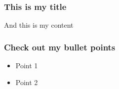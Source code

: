\documentclass{beamer}
\author{My Name}
\begin{document}
\begin{frame}
\titlepage
\end{frame}

\begin{frame}
\frametitle{This is my title}
And this is my content
\end{frame}

\begin{frame}
\frametitle{Check out my bullet points}
\begin{itemize}
	\item{Point 1}
	\item{Point 2}
\end{itemize}
\end{frame}
\end{document}
